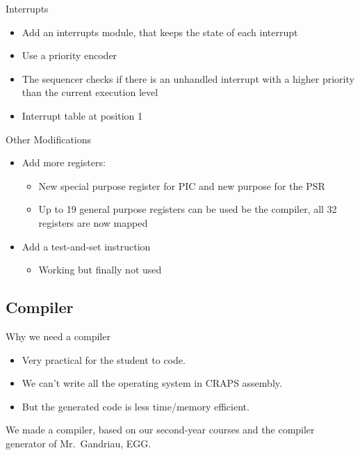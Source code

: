 \documentclass{beamer}
\begin{document}
      \begin{frame}{Interrupts}
        \begin{itemize}
          \item Add an interrupts module, that keeps the state of each interrupt
          \item Use a priority encoder
          \item The sequencer checks if there is an unhandled interrupt with a
            higher priority than the current execution level
          \item Interrupt table at position 1
        \end{itemize}
      \end{frame}

      \begin{frame}{Other Modifications}
        \begin{itemize}
          \item Add more registers:
            \begin{itemize}
                \item New special purpose register for PIC and new purpose for
                  the PSR
                \item Up to 19 general purpose registers can be used be the
                  compiler, all 32 registers are now mapped
            \end{itemize}
          \pause
          \item Add a test-and-set instruction
            \begin{itemize}
                \item Working but finally not used
            \end{itemize}
        \end{itemize}
      \end{frame}

    \subsection{Compiler}
      \begin{frame}{Why we need a compiler}

        \begin{itemize}
          \item Very practical for the student to code.
          \item We can't write all the operating system in CRAPS assembly.
          \item But the generated code is less time/memory efficient.
        \end{itemize}

        We made a compiler, based on our second-year courses and the compiler
        generator of Mr.\ Gandriau, EGG.
      \end{frame}
\end{document}
